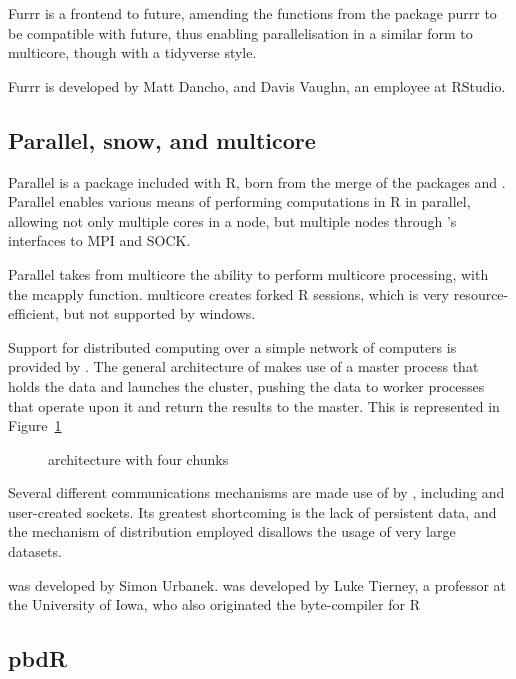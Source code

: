 Furrr is a frontend to future, amending the functions from the package
purrr to be compatible with future, thus enabling parallelisation in a
similar form to multicore, though with a tidyverse
style\cite{vaughan18}.

Furrr is developed by Matt Dancho, and Davis Vaughn, an employee at
RStudio.

\hypertarget{sec:parall-snow-mult}{%
    \subsection{Parallel, snow, and multicore}\label{sec:parall-snow-mult}}

Parallel is a package included with R, born from the merge of the
packages  and \cite{core:_packag}. Parallel enables
various means of performing computations in R in parallel, allowing not
only multiple cores in a node, but multiple nodes through 's
interfaces to MPI and SOCK\cite{tierney18}.

Parallel takes from multicore the ability to perform multicore
processing, with the mcapply function. multicore creates forked R
sessions, which is very resource-efficient, but not supported by
windows.

Support for distributed computing over a simple network of computers is provided by .
The general architecture of  makes use of a master process that holds the data and launches the cluster, pushing the data to worker processes that operate upon it and return the results to the master.
This is represented in Figure~\cref{fig:snow}

\begin{figure}[H]

\caption{\label{fig:snow} architecture with four chunks}
\end{figure}

Several different communications mechanisms are made use of by , including  and user-created sockets.
Its greatest shortcoming is the lack of persistent data, and the mechanism of distribution employed disallows the usage of very large datasets.

 was developed by Simon Urbanek.  was developed by Luke
Tierney, a professor at the University of Iowa, who also originated the
byte-compiler for R

\hypertarget{pbdr}{%
    \subsection{pbdR}\label{pbdr}}

